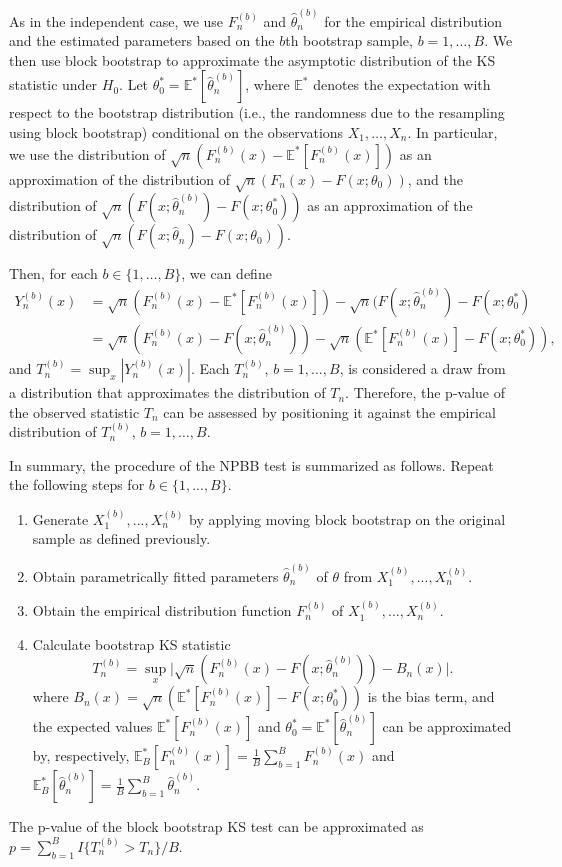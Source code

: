 \documentclass[APA,Times1COL]{WileyNJDv5} %
\begin{document}
As in the independent case,
we use $F^{(b)}_n$ and $\hat\theta^{(b)}_n$ for the empirical distribution and
the estimated parameters based on the $b$th bootstrap sample,
$b = 1, \ldots, B$.
We then use block bootstrap to approximate the asymptotic distribution of
the KS statistic under $H_0$. Let
$\theta_0^* = \mathbb{E}^{*}[\hat\theta^{(b)}_n]$, where
$\mathbb{E}^{*}$ denotes the expectation with respect to the
bootstrap distribution (i.e., the randomness due
to the resampling using block bootstrap) conditional on the observations 
$X_1, \dots, X_n$. In particular, we
use the distribution of $\sqrt{n}(F^{(b)}_n(x) - \mathbb{E}^{*}[F^{(b)}_n(x)])$
as an approximation of the distribution of
$\sqrt{n}(F_n(x) - F(x; \theta_0))$, and the distribution of 
$\sqrt{n}(F(x; \hat\theta^{(b)}_n) - F(x; \theta_0^*))$ as
an approximation of the distribution of 
$\sqrt{n}(F(x; \hat\theta_n) - F(x; \theta_0))$.


Then, for each $b \in \{1, \dots, B\}$, we can define
\begin{align*}
  Y^{(b)}_n(x) &= \sqrt{n}(F^{(b)}_n(x) - \mathbb{E}^{*}[F^{(b)}_n(x)]) - 
             \sqrt{n}(F(x; \hat\theta^{(b)}_n) - F(x; \theta_0^*) \\
           &= \sqrt{n}(F^{(b)}_n(x) - F(x; \hat\theta^{(b)}_n)) -
             \sqrt{n}(\mathbb{E}^{*}[F^{(b)}_n(x)] - F(x; \theta_0^*)),
\end{align*}
and $T^{(b)}_n = \sup_x|Y^{(b)}_n(x)|$. Each $T_n^{(b)}$,
$b =1, \ldots, B$, is considered a draw from a distribution that approximates
the distribution of $T_n$. Therefore, the p-value of the observed statistic
$T_n$ can be assessed by positioning it against the empirical distribution of
$T_n^{(b)}$, $b = 1, \ldots, B$.


In summary, the procedure of the NPBB test is 
summarized as follows. Repeat the following steps for $b \in \{1, ..., B\}$.
\begin{enumerate}
\item
  Generate $X^{(b)}_1,...,X^{(b)}_n$ by applying moving block bootstrap 
  on the original sample as
  defined previously.
\item
  Obtain parametrically fitted parameters 
  $\hat\theta^{(b)}_n$ of $\theta$ from $X^{(b)}_1,...,X^{(b)}_n$.  
\item
  Obtain the empirical distribution function $F^{(b)}_n$ of
  $X^{(b)}_1,...,X^{(b)}_n$. 
\item
  Calculate bootstrap KS statistic
  \[
    T^{(b)}_n = \sup_x \Big\vert \sqrt{n}\left(F^{(b)}_n(x) 
    - F(x; \hat\theta^{(b)}_n)\right) - B_n(x) \Big\vert.
  \]
  where 
  $B_{n}(x) = \sqrt{n}(\mathbb{E}^{*}[F^{(b)}_n(x)] - 
  F(x; \theta_0^*))$ is the bias term, and
  the expected values $\mathbb{E}^{*}[F^{(b)}_n(x)]$ and
$\theta_0^* = \mathbb{E}^{*}[\hat\theta^{(b)}_n]$ can be
approximated by, respectively,
$\mathbb{E}_B^{*}[F^{(b)}_n(x)] = \frac{1}{B}\sum_{b = 1}^B F^{(b)}_n(x)$ and
$\mathbb{E}_B^{*}[\hat\theta^{(b)}_n]  =  \frac{1}{B}\sum_{b = 1}^B\hat\theta^{(b)}_n$.
\end{enumerate}
The p-value of the block bootstrap KS test can be approximated
as $p = \sum_{b=1}^B I\{T^{(b)}_n > T_n\} / B$.
\end{document}

